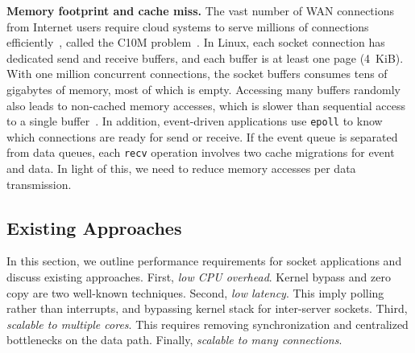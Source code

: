 \textbf{Memory footprint and cache miss.}
The vast number of WAN connections from Internet users require cloud systems to serve millions of connections efficiently~\cite{nishtala2013scaling,lin2016scalable,belay2017ix}, called the C10M problem~\cite{graham2013c10m}. In Linux, each socket connection has dedicated send and receive buffers, and each buffer is at least one page (4~KiB). With one million concurrent connections, the socket buffers consumes tens of gigabytes of memory, most of which is empty. Accessing many buffers randomly also leads to non-cached memory accesses, which is slower than sequential access to a single buffer~\cite{li2017kv}. In addition, event-driven applications use \texttt{epoll} to know which connections are ready for send or receive. If the event queue is separated from data queues, each \texttt{recv} operation involves two cache migrations for event and data. In light of this, we need to reduce memory accesses per data transmission.




\subsection{Existing Approaches}
\label{subsec:related}

In this section, we outline performance requirements for socket applications and discuss existing approaches. First, \textit{low CPU overhead}. Kernel bypass and zero copy are two well-known techniques. Second, \textit{low latency}. This imply polling rather than interrupts, and bypassing kernel stack for inter-server sockets. Third, \textit{scalable to multiple cores}. This requires removing synchronization and centralized bottlenecks on the data path. Finally, \textit{scalable to many connections}.


